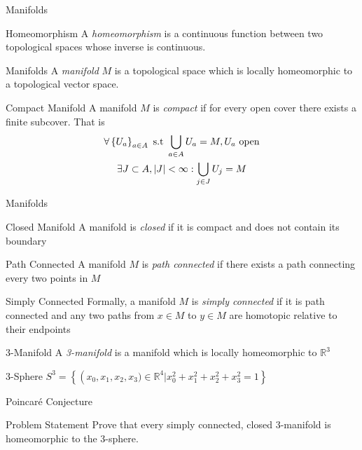 \documentclass{beamer}
\newcommand{\Poincare}{Poincar\'{e}}
\newcommand{\Real}{\mathbb{R}}
\begin{document}
  \begin{frame}{Manifolds}
      \linespread{0.8}
      \pause
      \begin{block}{Homeomorphism}
          A \textit{homeomorphism} is a continuous function between two
          topological spaces whose inverse is continuous.
      \end{block}
      \pause
      \begin{block}{Manifolds}
          A \textit{manifold} $M$ is a topological space which is locally
          homeomorphic to a topological vector space.
      \end{block}
      \pause
      \begin{block}{Compact Manifold}
          A manifold $M$ is \textit{compact} if for every open cover there
          exists a finite subcover. That is
          \begin{multline*}
              \linespread{0.8}
          \forall \left\{U_a\right\}_{a \in A} \textrm{ s.t } \bigcup_{a\in A}
          U_a = M,
          U_a \textrm{ open}\\
          \exists J \subset A, |J| < \infty : \bigcup_{j \in J}U_j = M
          \end{multline*}
      \end{block}
  \end{frame}
  \begin{frame}{Manifolds}
      \linespread{0.8}
      \pause
      \begin{block}{Closed Manifold}
          A manifold is \textit{closed} if it is compact and does not contain
          its boundary
      \end{block}
      \pause
      \begin{block}{Path Connected}
          A manifold $M$ is \textit{path connected} if there exists a path
          connecting every two points in $M$
      \end{block}
      \pause
      \begin{block}{Simply Connected}
          Formally, a manifold $M$ is \textit{simply connected} if it is path
          connected and any two paths from $x \in M$ to $y \in M$ are
          homotopic relative to their endpoints
      \end{block}
      \pause
      \begin{block}{3-Manifold}
          A \textit{3-manifold} is a manifold which is locally homeomorphic to
          $\Real^3$
      \end{block}
      \pause
      \begin{block}{3-Sphere}
          $S^3 = \left\{\left(x_0, x_1, x_2, x_3) \in \Real^4 | x_0^2 + x_1^2 + x_2^2 +
          x_3^2 = 1\right\}$
      \end{block}
  \end{frame}
  \begin{frame}{\Poincare{} Conjecture}
      \begin{block}{Problem Statement}
          Prove that every simply connected, closed 3-manifold is
          homeomorphic to the 3-sphere.
      \end{block}
  \end{frame}
\end{document}
